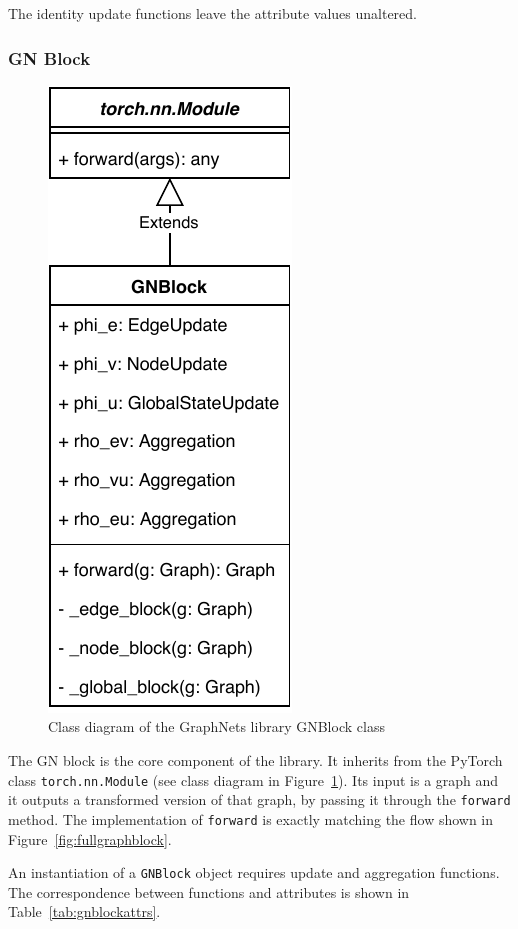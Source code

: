 The identity update functions leave the attribute values unaltered.

\subsubsection{GN Block}

\begin{figure}\centering
    \includegraphics[scale=0.65]{resources/graphnets-block}
    \caption{Class diagram of the GraphNets library GNBlock class}\label{fig:classdiagramgnblock}
\end{figure}

The GN block is the core component of the library. It inherits from the PyTorch class \texttt{torch.nn.Module} (see class diagram in Figure~\ref{fig:classdiagramgnblock}). Its input is a graph and it outputs a transformed version of that graph, by passing it through the \texttt{forward} method. The implementation of \texttt{forward} is exactly matching the flow shown in Figure~\ref{fig:fullgraphblock}.

An instantiation of a \texttt{GNBlock} object requires update and aggregation functions. The correspondence between functions and attributes is shown in Table~\ref{tab:gnblockattrs}.

